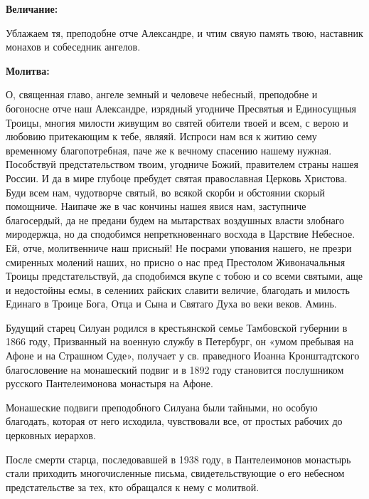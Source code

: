\medskip
\bfseries Величание:\normalfont{}


Ублажаем тя, преподобне отче Александре, и чтим свяую память твою, наставник монахов и собеседник ангелов.


\medskip
\bfseries Молитва:\normalfont{}


О, священная главо, ангеле земный и человече небесный, преподобне и богоносне отче наш Александре, изрядный угодниче Пресвятыя и Единосущныя Троицы, многия милости живущим во святей обители твоей и всем, с верою и любовию притекающим к тебе, являяй. Испроси нам вся к житию сему временному благопотребная, паче же к вечному спасению нашему нужная. Пособствуй предстательством твоим, угодниче Божий, правителем страны нашея России. И да в мире глубоце пребудет святая православная Церковь Христова. Буди всем нам, чудотворче святый, во всякой скорби и обстоянии скорый помощниче. Наипаче же в час кончины нашея явися нам, заступниче благосердый, да не предани будем на мытарствах воздушных власти злобнаго миродержца, но да сподобимся непреткновеннаго восхода в Царствие Небесное. Ей, отче, молитвенниче наш присный! Не посрами упования нашего, не презри смиренных молений наших, но присно о нас пред Престолом Живоначальныя Троицы предстательствуй, да сподобимся вкупе с тобою и со всеми святыми, аще и недостойны есмы, в селениих райских славити величие, благодать и милость Единаго в Троице Бога, Отца и Сына и Святаго Духа во веки веков. Аминь.

\bigskip\bigskip\mychapterending

 

Будущий старец Силуан родился в крестьянской семье Тамбовской губернии в 1866 году, Призванный на военную службу в Петербург, он «умом пребывая на Афоне и на Страшном Суде», получает у св. праведного Иоанна Кронштадтского благословение на монашеский подвиг и в 1892 году становится послушником русского Пантелеимонова монастыря на Афоне. 


Монашеские подвиги преподобного Силуана были тайными, но особую благодать, которая от него исходила, чувствовали все, от простых рабочих до церковных иерархов. 


После смерти старца, последовавшей в 1938 году, в Пантелеимонов монастырь стали приходить многочисленные письма, свидетельствующие о его небесном предстательстве за тех, кто обращался к нему с молитвой.



